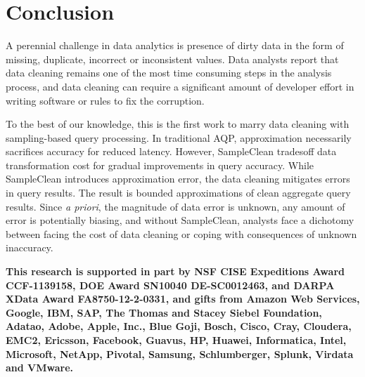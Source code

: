 \section{Conclusion}
A perennial challenge in data analytics is presence of dirty data
in the form of missing, duplicate, incorrect or inconsistent values.
Data analysts report that data cleaning remains one of the most time
consuming steps in the analysis process, and data cleaning can require
a significant amount of developer effort in writing software or rules
to fix the corruption. 

To the best of our knowledge, this is the first work to marry data cleaning with sampling-based query processing.
In traditional AQP, approximation necessarily sacrifices accuracy for reduced latency. 
However, SampleClean tradesoff data transformation cost for gradual improvements in query accuracy.
While SampleClean introduces approximation error, the data cleaning mitigates errors in query results.
The result is bounded approximations of clean aggregate query results.
Since \emph{a priori}, the magnitude of data
error is unknown, any amount of error is potentially biasing, and
without SampleClean, analysts face a dichotomy between facing the cost of data cleaning
or coping with consequences of unknown inaccuracy.

\vspace{1.5em}

\textbf{\small This research is supported in part by NSF CISE Expeditions Award CCF-1139158, DOE Award SN10040 DE-SC0012463, and DARPA XData Award FA8750-12-2-0331, and gifts from Amazon Web Services, Google, IBM, SAP, The Thomas and Stacey Siebel Foundation, Adatao, Adobe, Apple, Inc., Blue Goji, Bosch, Cisco, Cray, Cloudera, EMC2, Ericsson, Facebook, Guavus, HP, Huawei, Informatica, Intel, Microsoft, NetApp, Pivotal, Samsung, Schlumberger, Splunk, Virdata and VMware.}